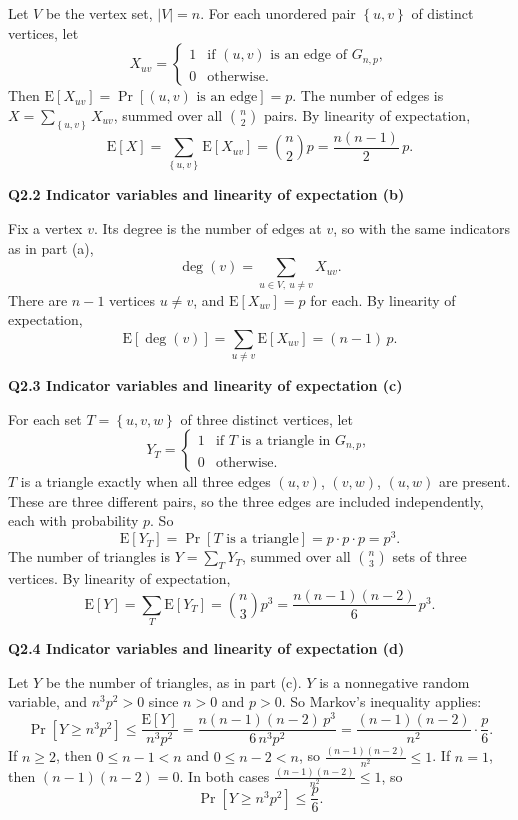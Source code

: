 \documentclass[11pt]{article}
\newcommand{\set}[1]{\left\{#1\right\}}
\newcommand{\abs}[1]{\left|#1\right|}
\newcommand{\Ex}{\mathrm{E}}
\newcommand{\qpage}[1]{\clearpage\noindent\textbf{\large #1}\par\medskip}
\begin{document}
Let $V$ be the vertex set, $\abs{V} = n$.
For each unordered pair $\set{u, v}$ of distinct vertices, let
\[
  X_{uv} = \begin{cases} 1 & \text{if } (u, v) \text{ is an edge of } G_{n,p}, \\ 0 & \text{otherwise.} \end{cases}
\]
Then $\Ex[X_{uv}] = \Pr[(u, v) \text{ is an edge}] = p$.
The number of edges is $X = \sum_{\set{u, v}} X_{uv}$, summed over all $\binom{n}{2}$ pairs.
By linearity of expectation,
\[
  \Ex[X] = \sum_{\set{u, v}} \Ex[X_{uv}] = \binom{n}{2} p = \frac{n(n-1)}{2}\, p.
\]

\qpage{Q2.2 Indicator variables and linearity of expectation (b)}

Fix a vertex $v$.
Its degree is the number of edges at $v$, so with the same indicators as in part (a),
\[
  \deg(v) = \sum_{u \in V,\ u \neq v} X_{uv}.
\]
There are $n - 1$ vertices $u \neq v$, and $\Ex[X_{uv}] = p$ for each.
By linearity of expectation,
\[
  \Ex[\deg(v)] = \sum_{u \neq v} \Ex[X_{uv}] = (n - 1)\, p.
\]

\qpage{Q2.3 Indicator variables and linearity of expectation (c)}

For each set $T = \set{u, v, w}$ of three distinct vertices, let
\[
  Y_T = \begin{cases} 1 & \text{if } T \text{ is a triangle in } G_{n,p}, \\ 0 & \text{otherwise.} \end{cases}
\]
$T$ is a triangle exactly when all three edges $(u, v)$, $(v, w)$, $(u, w)$ are present.
These are three different pairs, so the three edges are included independently, each with probability $p$.
So
\[
  \Ex[Y_T] = \Pr[T \text{ is a triangle}] = p \cdot p \cdot p = p^3.
\]
The number of triangles is $Y = \sum_T Y_T$, summed over all $\binom{n}{3}$ sets of three vertices.
By linearity of expectation,
\[
  \Ex[Y] = \sum_T \Ex[Y_T] = \binom{n}{3} p^3 = \frac{n(n-1)(n-2)}{6}\, p^3.
\]

\qpage{Q2.4 Indicator variables and linearity of expectation (d)}

Let $Y$ be the number of triangles, as in part (c).
$Y$ is a nonnegative random variable, and $n^3 p^2 > 0$ since $n > 0$ and $p > 0$.
So Markov's inequality applies:
\[
  \Pr[Y \geq n^3 p^2] \leq \frac{\Ex[Y]}{n^3 p^2}
  = \frac{n(n-1)(n-2)\, p^3}{6\, n^3 p^2}
  = \frac{(n-1)(n-2)}{n^2} \cdot \frac{p}{6}.
\]
If $n \geq 2$, then $0 \leq n - 1 < n$ and $0 \leq n - 2 < n$, so $\frac{(n-1)(n-2)}{n^2} \leq 1$.
If $n = 1$, then $(n-1)(n-2) = 0$.
In both cases $\frac{(n-1)(n-2)}{n^2} \leq 1$, so
\[
  \Pr[Y \geq n^3 p^2] \leq \frac{p}{6}.
\]
\end{document}
